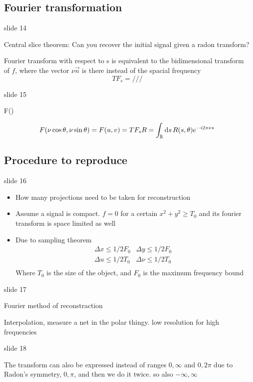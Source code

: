 \documentclass[../main/main.tex]{subfiles}
\begin{document}
\subsection{Fourier transformation}

slide 14

Central slice theorem: Can you recover the initial signal given a radon transform?

Fourier transform with respect to s is equivalent to the bidimensional transform of $f$, where the vector $\nu \vec{n}$ is there instead of the spacial frequency
\begin{equation}
TF_{s} =///
\end{equation}

slide 15

F()

\begin{equation}
F(\nu \cos \theta, \nu \sin \theta) = F(u, v) = TF_{s}{R} = \int_{\mathbb{R}} \dd{s} R(s, \theta ) e^{-i2\pi \nu s}
\end{equation}

\subsection{Procedure to reproduce}

slide 16

\begin{itemize}
	\item How many projections need to be taken for reconstruction
	\item Assume a signal is compact. $f = 0$ for a certain $x^{2}+y^{2} \geq T_{0}$ and its fourier transform is space limited as well
	\item Due to sampling theorem
\begin{align}
\Delta x \leq 1/2F_{0} & \Delta y \leq 1/2F_{0} \\
\Delta u \leq 1/2T_{0} & \Delta \nu \leq 1/2T_{0} \\
\end{align}
Where $T_{0}$ is the size of the object, and  $F_{0}$ is the maximum frequency bound

\end{itemize}

slide 17

Fourier method of reconstraction

Interpolation, measure a net in the polar thingy. low resolution for high frequencies


slide 18

The transform can also be expressed instead of ranges $0, \infty$ and $0, 2\pi$ due to Radon's symmetry, $0, \pi$, and then we do it twice. so also $-\infty, \infty $
\end{document}
